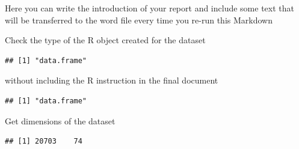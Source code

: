 Here you can write the introduction of your report and include some text
that will be transferred to the word file every time you re-run this
Markdown

\begin{Shaded}
\begin{Highlighting}[]
\StringTok{ }\NormalTok{(}\NormalTok{(}\NormalTok{))}

\end{Highlighting}
\end{Shaded}

Check the type of the R object created for the dataset

\begin{Shaded}
\begin{Highlighting}[]
\end{Highlighting}
\end{Shaded}

\begin{verbatim}
## [1] "data.frame"
\end{verbatim}

without including the R instruction in the final document

\begin{verbatim}
## [1] "data.frame"
\end{verbatim}

Get dimensions of the dataset

\begin{Shaded}
\begin{Highlighting}[]
\end{Highlighting}
\end{Shaded}

\begin{verbatim}
## [1] 20703    74
\end{verbatim}

\begin{Shaded}
\begin{Highlighting}[]
\NormalTok{(dd)[}\NormalTok{]}
\NormalTok{(dd)[}\NormalTok{]}

\end{Highlighting}
\end{Shaded}

